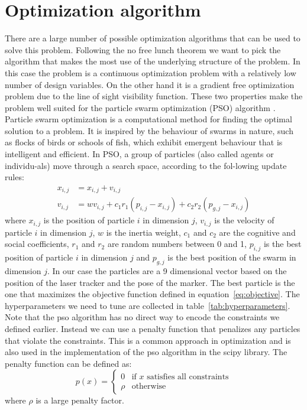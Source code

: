 \documentclass{svproc}
\begin{document}
\section{Optimization algorithm}
There are a large number of possible optimization algorithms that can be used to solve this problem.
Following the no free lunch theorem \cite{no_free_lunch_theorem} we want to pick the algorithm that makes the most use of the underlying structure of the problem.
In this case the problem is a continuous optimization problem with a relatively low number of design variables.
On the other hand it is a gradient free optimization problem due to the line of sight visibility function.
These two properties make the problem well suited for the particle swarm optimization (PSO) algorithm \cite{pso}.
Particle swarm optimization is a computational method for finding the optimal solution to a problem.
It is inspired by the behaviour of swarms in nature, such as flocks of birds or schools of fish, which exhibit emergent behaviour that is intelligent and efficient.
 In PSO, a group of particles (also called agents or individu-als) move through a search space, according to the fol-lowing update rules:
\begin{equation}
        \begin{split}
        x_{i,j} &= x_{i,j} + v_{i,j} \\
    v_{i,j} &= wv_{i,j} + c_1r_1(p_{i,j}-x_{i,j}) + c_2r_2(p_{g,j}-x_{i,j})
        \end{split}
\end{equation}
where $x_{i,j}$ is the position of particle $i$ in dimension $j$, $v_{i,j}$ is the velocity of particle $i$ in dimension $j$, $w$ is the inertia weight,
 $c_1$ and $c_2$ are the cognitive and social coefficients, $r_1$ and $r_2$ are random numbers between 0 and 1, $p_{i,j}$ is the best position of particle $i$ in dimension $j$ and $p_{g,j}$
is the best position of the swarm in dimension $j$.
In our case the particles are a 9 dimensional vector based on the position of the laser tracker and the pose of the marker.
The best particle is the one that maximizes the objective function defined in equation~\ref{eq:objective}.
The hyperparameters we need to tune are collected in table~\ref{tab:hyperparameters}.
Note that the pso algorithm has no direct way to encode the constraints we defined earlier.
Instead we can use a penalty function that penalizes any particles that violate the constraints.
This is a common approach in optimization and is also used in the implementation of the pso algorithm in the scipy library. %
The penalty function can be defined as:
\begin{equation}
    p(x) =  \begin{cases}
        0 & \text{if } x \text{ satisfies all constraints} \\
        \rho & \text{otherwise}
    \end{cases}
\end{equation}
where $\rho$ is a large penalty factor.
\end{document}

